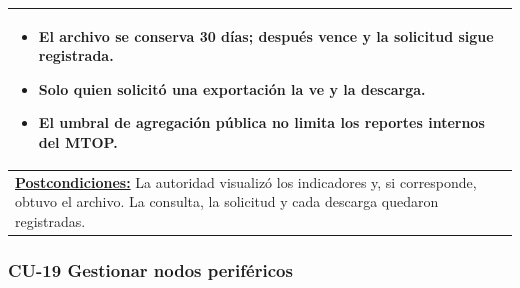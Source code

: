 \begin{table}[H]
\begin{tabular}{|p{15.8cm}|}
\begin{itemize}[leftmargin=*,topsep=2pt,itemsep=1pt,parsep=0pt,partopsep=0pt]
    \item El archivo se conserva 30 días; después vence y la solicitud sigue registrada.
    \item Solo quien solicitó una exportación la ve y la descarga.
    \item El umbral de agregación pública no limita los reportes internos del MTOP.
\end{itemize} \\ \hline
\textbf{\underline{Postcondiciones:}} La autoridad visualizó los indicadores y, si corresponde, obtuvo el archivo. La consulta, la solicitud y cada descarga quedaron registradas. \\ \hline
\end{tabular}
\end{table}

\subsubsection{CU-19 Gestionar nodos periféricos}\label{sec:cu-19}
